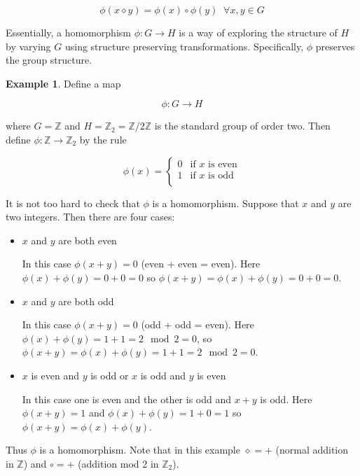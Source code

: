 \documentclass{article}
\theoremstyle{definition}
\newtheorem{example}{Example}[section]
\begin{document}
\medskip
\begin{equation*}
\phi(x \diamond y) = \phi(x) \circ \phi(y) \;\; \forall x,y \in G
\end{equation*}

\bigskip
\noindent
Essentially, a homomorphism $\phi: G \rightarrow H$ is a way of
exploring the structure of $H$ by varying $G$ using structure
preserving transformations. Specifically, $\phi$ preserves the
group structure.


\bigskip
\noindent
\begin{example} Define a map 

\begin{equation*}
\phi : G \rightarrow H
\end{equation*}

\bigskip
\noindent
where $G = \mathbb{Z}$ and $H = \mathbb{Z}_2 =
\mathbb{Z}/2\mathbb{Z}$ is the standard group of order two. Then
define $\phi: \mathbb{Z} \rightarrow \mathbb{Z}_2$ by the rule

\begin{equation*}
  \phi(x) =
    \begin{cases}
      0 & \text{if $x$ is even} \\
      1 & \text{if $x$ is odd}  \\
    \end{cases}       
\end{equation*}

\bigskip
\noindent
It is not too hard to check that $\phi$ is a homomorphism. 
Suppose that $x$ and $y$ are two integers. Then there are 
four cases:

\begin{itemize}
 \item $x$ and $y$ are both even
 
 In this case $\phi(x+y) = 0$ (even + even = even). Here
 $\phi(x)+\phi(y) = 0+0 = 0$ so $\phi(x+y) = \phi(x) + \phi(y) =
 0 + 0 = 0$.
 
 \item $x$ and $y$ are both odd
  
In this case $\phi(x+y) = 0$ (odd + odd = even). Here $\phi(x) +
\phi(y) = 1 + 1 = 2 \mod 2 = 0$, so $\phi(x+y) = \phi(x) +
\phi(y) = 1 + 1 = 2 \mod 2 = 0$.

 \item $x$ is even and $y$ is odd or  $x$ is odd and  $y$ is even
 
In this case one is even and the other is odd and $x + y$ is odd.
Here $\phi(x+y) = 1$ and $\phi(x)+\phi(y) = 1+0 = 1$ so
$\phi(x+y) = \phi(x)+\phi(y)$.
 \end{itemize}
 
\smallskip
\noindent
Thus $\phi$ is a homomorphism. Note that in this example
$\diamond = +$ (normal addition in $\mathbb{Z}$) and $\circ = +$
(addition mod 2 in $\mathbb{Z}_2$).
\end{example}
\end{document}
